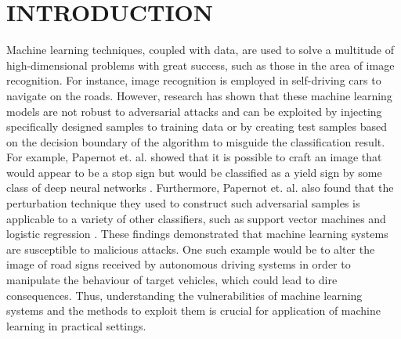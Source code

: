 \section{INTRODUCTION}

Machine learning techniques, coupled with data, are used to solve a multitude of high-dimensional problems with great success, such as those in the area of image recognition. For instance, image recognition is employed in self-driving cars to navigate on the roads. However, research has shown that these machine learning models are not robust to adversarial attacks and can be exploited by injecting specifically designed samples to training data or by creating test samples based on the decision boundary of the algorithm to misguide the classification result. For example, Papernot et. al. showed that it is possible to craft an image that would appear to be a stop sign but would be classified as a yield sign by some class of deep neural networks . Furthermore, Papernot et. al. also found that the perturbation technique they used to construct such adversarial samples is applicable to a variety of other classifiers, such as support vector machines and logistic regression . These findings demonstrated that machine learning systems are susceptible to malicious attacks. One such example would be to alter the image of road signs received by autonomous driving systems in order to manipulate the behaviour of target vehicles, which could lead to dire consequences. Thus, understanding the vulnerabilities of machine learning systems and the methods to exploit them is crucial for application of machine learning in practical settings.